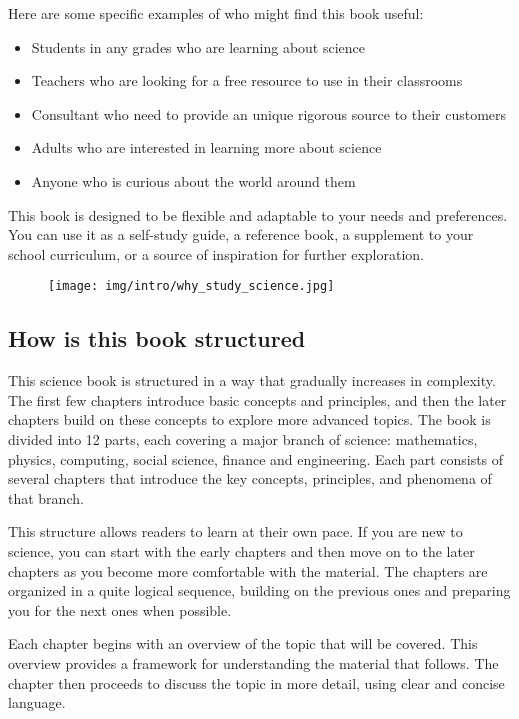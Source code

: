  	Here are some specific examples of who might find this book useful:
	\begin{itemize}
		\item Students in any grades who are learning about science
		
		\item Teachers who are looking for a free resource to use in their classrooms
		
		\item Consultant who need to provide an unique rigorous source to their customers
		
		\item Adults who are interested in learning more about science
		
		\item Anyone who is curious about the world around them
	\end{itemize}
	This book is designed to be flexible and adaptable to your needs and preferences. You can use it as a self-study guide, a reference book, a supplement to your school curriculum, or a source of inspiration for further exploration.
	
	\begin{figure}[H]
		\centering
		\texttt{[image: img/intro/why\_study\_science.jpg]}
	\end{figure} 
	
	\pagebreak
 	\subsection{How is this book structured}
 	This science book is structured in a way that gradually increases in complexity.  The first few chapters introduce basic concepts and principles, and then the later chapters build on these concepts to explore more advanced topics. The book is divided into 12 parts, each covering a major branch of science: mathematics, physics, computing, social science, finance and engineering.  Each part consists of several chapters that introduce the key concepts, principles, and phenomena of that branch.

	This structure allows readers to learn at their own pace. If you are new to science, you can start with the early chapters and then move on to the later chapters as you become more comfortable with the material. The chapters are organized in a quite logical sequence, building on the previous ones and preparing you for the next ones when possible.

	Each chapter begins with an overview of the topic that will be covered. This overview provides a framework for understanding the material that follows. The chapter then proceeds to discuss the topic in more detail, using clear and concise language.
	
